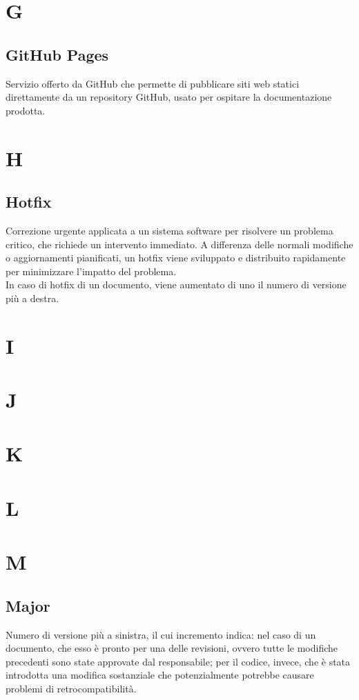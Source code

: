 \section{G}
    \subsection{GitHub Pages}
    Servizio offerto da GitHub che permette di pubblicare siti web statici direttamente da un repository GitHub,
    usato per ospitare la documentazione prodotta.
\section{H}
    \subsection{Hotfix}
    Correzione urgente applicata a un sistema software per risolvere un problema critico, 
    che richiede un intervento immediato. A differenza delle normali modifiche o aggiornamenti pianificati, 
    un hotfix viene sviluppato e distribuito rapidamente per minimizzare l'impatto del problema.\\
    In caso di hotfix di un documento, viene aumentato di uno il numero di versione più a destra.

\section{I}
\section{J}
\section{K}
\section{L}
\section{M}
    \subsection{Major}
    Numero di versione più a sinistra, il cui incremento indica: nel caso di un documento, che esso è pronto per una delle revisioni, ovvero tutte le modifiche precedenti sono state 
    approvate dal responsabile; per il codice, invece, che è stata introdotta una modifica sostanziale che potenzialmente potrebbe causare problemi di retrocompatibilità.
